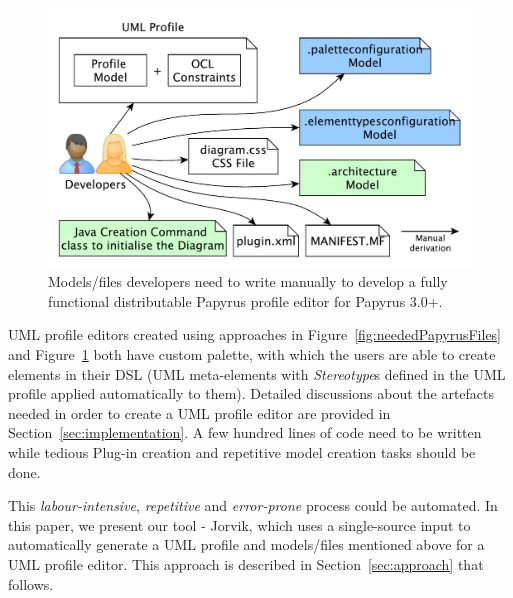 \begin{figure}[ht!]
	\centering
	\includegraphics[width=1\textwidth]{diagrams/neededPapyrusFiles_new.pdf}
	\vspace{-3mm}
	\caption[]{Models/files developers need to write manually to 
		develop a fully functional distributable Papyrus profile editor for Papyrus 3.0+.}
	\label{fig:neededPapyrusFiles_new}
	\vspace*{-3mm}
\end{figure}


UML profile editors created using approaches in Figure~\ref{fig:neededPapyrusFiles} and Figure~\ref{fig:neededPapyrusFiles_new} both have custom palette, with which the users are able to create elements in their DSL (UML meta-elements with \textit{Stereotype}s defined in the UML profile applied automatically to them).
Detailed discussions about the artefacts needed in order to create a UML profile editor are provided in Section~\ref{sec:implementation}.
A few hundred lines of code need to be written while tedious Plug-in creation and repetitive model creation tasks should be done. 

This \textit{labour-intensive}, \textit{repetitive} and \textit{error-prone} process could be automated. 
In this paper, we present our tool - Jorvik, which uses a single-source input to automatically generate a UML profile and models/files mentioned above for a UML profile editor. 
This approach is described in Section~\ref{sec:approach} that follows. 
